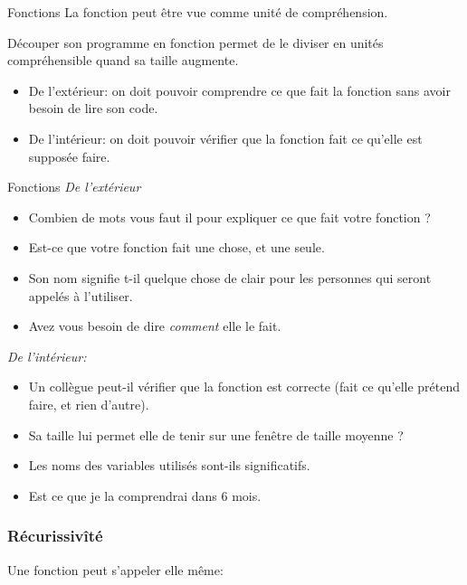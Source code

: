 \documentclass{beamer}
\begin{document}
\begin{frame}{Fonctions}
  La fonction peut être vue comme unité de compréhension.
  
  Découper son programme en fonction permet de le diviser en unités compréhensible quand sa taille augmente.

  \begin{itemize}
  \item De l'extérieur: on doit pouvoir comprendre ce que fait la fonction sans avoir besoin de lire son code.
  \item De l'intérieur: on doit pouvoir vérifier que la fonction fait ce qu'elle est supposée faire.
  \end{itemize}
\end{frame}

\begin{frame}{Fonctions}
  {\em De l'extérieur}
  \begin{itemize}
  \item Combien de mots vous faut il pour expliquer ce que fait votre fonction ?
  \item Est-ce que votre fonction fait une chose, et une seule.
  \item Son nom signifie t-il quelque chose de clair pour les personnes qui seront appelés à l'utiliser.
  \item Avez vous besoin de dire {\em comment} elle le fait.
  \end{itemize}    
  {\em De l'intérieur:}
  \begin{itemize}
  \item Un collègue peut-il vérifier que la fonction est correcte (fait ce qu'elle prétend faire, et rien d'autre).
  \item Sa taille lui permet elle de tenir sur une fenêtre de taille moyenne ?
  \item Les noms des variables utilisés sont-ils significatifs.
  \item Est ce que je la comprendrai dans 6 mois.
  \end{itemize}
\end{frame}

\begin{frame}[fragile]\frametitle{Récurissivîté}
  Une fonction peut s'appeler elle même:
  
  \fbox{}

\end{frame}
\end{document}
